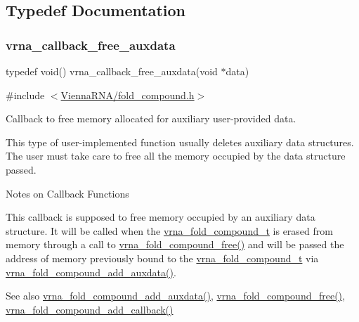 \subsection{Typedef Documentation}
\mbox{\label{group__fold__compound_ga7806651f51b195013839a218b3bbd5a3}} 
\subsubsection{\texorpdfstring{vrna\+\_\+callback\+\_\+free\+\_\+auxdata}{vrna\_callback\_free\_auxdata}}
{\footnotesize\ttfamily typedef void() vrna\+\_\+callback\+\_\+free\+\_\+auxdata(void $\ast$data)}



{\ttfamily \#include $<$\hyperlink{fold__compound_8h}{Vienna\+R\+N\+A/fold\+\_\+compound.\+h}$>$}



Callback to free memory allocated for auxiliary user-\/provided data. 

This type of user-\/implemented function usually deletes auxiliary data structures. The user must take care to free all the memory occupied by the data structure passed.

\begin{DoxyRefDesc}{Notes on Callback Functions}
\item[\hyperlink{callbacks__callbacks000005}{Notes on Callback Functions}]This callback is supposed to free memory occupied by an auxiliary data structure. It will be called when the \hyperlink{group__fold__compound_ga1b0cef17fd40466cef5968eaeeff6166}{vrna\+\_\+fold\+\_\+compound\+\_\+t} is erased from memory through a call to \hyperlink{group__fold__compound_gadded6039d63f5d6509836e20321534ad}{vrna\+\_\+fold\+\_\+compound\+\_\+free()} and will be passed the address of memory previously bound to the \hyperlink{group__fold__compound_ga1b0cef17fd40466cef5968eaeeff6166}{vrna\+\_\+fold\+\_\+compound\+\_\+t} via \hyperlink{group__fold__compound_ga6316a9426bea2f742375e8df6febd3f6}{vrna\+\_\+fold\+\_\+compound\+\_\+add\+\_\+auxdata()}. \end{DoxyRefDesc}


\begin{DoxySeeAlso}{See also}
\hyperlink{group__fold__compound_ga6316a9426bea2f742375e8df6febd3f6}{vrna\+\_\+fold\+\_\+compound\+\_\+add\+\_\+auxdata()}, \hyperlink{group__fold__compound_gadded6039d63f5d6509836e20321534ad}{vrna\+\_\+fold\+\_\+compound\+\_\+free()}, \hyperlink{group__fold__compound_ga097ed6133055624667cbce8cfdebf82d}{vrna\+\_\+fold\+\_\+compound\+\_\+add\+\_\+callback()}
\end{DoxySeeAlso}

